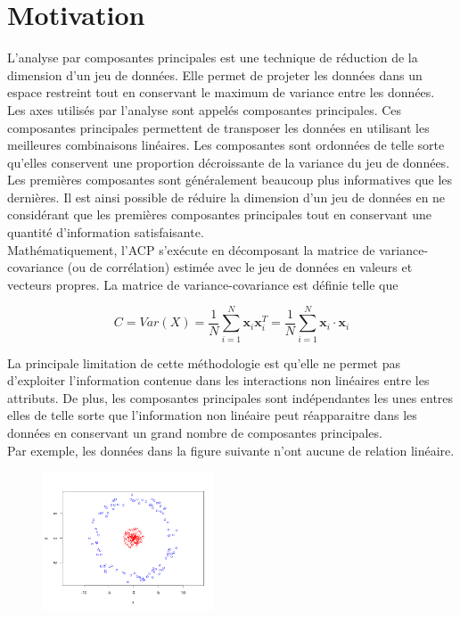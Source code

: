 \section{Motivation}

L’analyse par composantes principales est une technique de réduction de la dimension d’un jeu de données. Elle permet de projeter les données dans un espace restreint tout en conservant le maximum de variance entre les données. 
Les axes utilisés par l’analyse sont appelés composantes principales. Ces composantes principales permettent de transposer les 
données en utilisant les meilleures combinaisons linéaires. Les composantes sont ordonnées de telle sorte qu’elles conservent
 une proportion décroissante de la variance du jeu de données. Les premières composantes sont généralement beaucoup plus 
 informatives que les dernières. Il est ainsi possible de réduire la dimension d’un jeu de données en ne considérant que les premières composantes principales tout en conservant une quantité d’information satisfaisante.\\

Mathématiquement, l’ACP s'exécute en décomposant la matrice de variance-covariance (ou de corrélation) estimée avec le jeu de données en valeurs et vecteurs propres. La matrice de variance-covariance est définie telle que

$$C = Var(X) = \frac{1}{N} \sum_{i = 1}^{N}   \textbf{x}_i\textbf{x}_i^{T} = \frac{1}{N} \sum_{i = 1}^{N}   \textbf{x}_i \cdot \textbf{x}_i$$

La principale limitation de cette méthodologie est qu’elle ne permet pas d’exploiter l’information contenue dans les interactions non linéaires entre les attributs. De plus, les composantes principales sont indépendantes les unes entres elles de telle sorte que l'information non linéaire peut réapparaitre dans les données en conservant un grand nombre de composantes principales. \\

Par exemple, les données dans la figure suivante n'ont aucune de relation linéaire. 

\begin{figure}[H]
	\centering
	\includegraphics[width=2in]{exemple_1_initial}
\end{figure}

